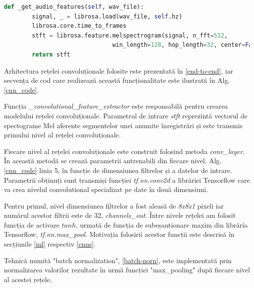 \documentclass[a4paper,12pt]{book}
\begin{document}
				\begin{lstlisting}[language=Python, caption={Extragerea spectogramei Mel, 3.4.1, folosind librăria librosa.}, xleftmargin=0cm]
  def _get_audio_features(self, wav_file):
		signal, _ = librosa.load(wav_file, self.hz)
		librosa.core.time_to_frames
		stft = librosa.feature.melspectrogram(signal, n_fft=512, 
							   win_length=128, hop_length=32, center=False)
		return stft	\end{lstlisting} \par
				Arhitectura rețelei convoluționale folosite este prezentată în \ref{end-to-end}, iar secvența de cod care realizează această funcționalitate este ilustrată în Alg. \ref{cnn_code}. \par 
				Funcția \textit{\_convolutional\_feature\_extractor} este responsabilă pentru crearea modelului rețelei convoluționale. Parametrul de intrare \textit{stft} reprezintă vectorul de spectograme Mel aferente segmentelor unei anumite înregistrări și este transmis primului nivel al rețelei convoluționale. \par
				Fiecare nivel al rețelei convoluționale este construit folosind metoda \textit{conv\_layer}. În această metodă se crează parametrii antrenabili din fiecare nivel, Alg.\ref{cnn_code} linia 5, în funcție de dimensiunea filtrelor și a datelor de intrare. Parametrii obținuți sunt transmiși funcției \textit{tf.nn.conv2d} a librăriei Tensorflow care va crea nivelul convolutional specializat pe date în două dimensiuni. \par
				Pentru primul, nivel dimensiunea filtrelor a fost aleasă de \textit{8x8x1} pixeli iar numărul acestor filtrii este de 32, \textit{channels\_out}. Între nivele rețelei am folosit funcția de activare $tanh$, urmată de funcția de subeșantionare maxim din librăria Tensorflow, \textit{tf.nn.max\_pool}. Motivația folosirii acestor funcții este descrisă în secțiunile \ref{ml} respectiv \ref{cnns}.
				
				Tehnică numită "batch normalization", \ref{batch-norn}, este implementată prin normalizarea  valorilor rezultate în urmă funcției  "max\_pooling" după fiecare nivel al acestei rețele. \par 
				
\end{document}
